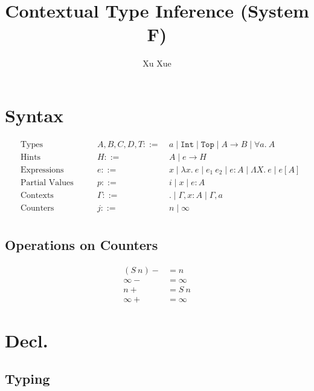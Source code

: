\documentclass{article}
\title{Contextual Type Inference (System F)}
\author{Xu Xue}
\begin{document}
\maketitle

\section{Syntax}

\begin{align*}
&\text{Types} \quad\quad &A, B, C, D, T ::=&~ a \mid \mathtt{Int} \mid \mathtt{Top} \mid A \rightarrow B \mid \forall a.~A\\
&\text{Hints} \quad\quad &H ::=&~ A \mid \boxed{e} \rightarrow H\\
&\text{Expressions} \quad \quad &e::=&~ x \mid \lambda x . ~e \mid e_1~e_2 \mid e : A \mid \Lambda X.~e \mid e[A]\\
&\text{Partial Values} \quad \quad &p::=&~ i \mid x \mid e : A\\
&\text{Contexts} \quad\quad &\Gamma::=&~ . \mid \Gamma, x : A \mid \Gamma, a\\
&\text{Counters} \quad\quad &j ::=&~ n \mid \infty\\
\end{align*}

\subsection{Operations on Counters}

\begin{align*}
    (S~n)- &= n \\
    \infty - &= \infty \\
    n+ &= S~n \\
    \infty + &= \infty
\end{align*}

\section{Decl.}

\subsection{Typing}
\end{document}
